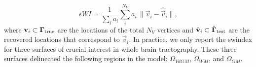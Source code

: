   \begin{equation}
  sWI = \frac{1}{\sum_i a_i} \sum\limits_i^{N_V} a_i\,\|
  \vec{v}_i - \hat{\vec{v}}_i \|,
  \label{eq:swindex}
  \end{equation}
  where $\mathbf{v}_i \subset \boldsymbol{\Gamma}_\text{true}$ are the locations of the total $N_V$ vertices
  and $\hat{\mathbf{v}}_i \subset \hat{\boldsymbol{\Gamma}}_\text{test}$ are the recovered locations
  that correspond to $\vec{v}_i$.
In practice, we only report the \gls*{swindex} for three surfaces of crucial interest in whole-brain
  tractography.
These three surfaces delineated the following regions in the model: $\Omega_{VdGM}$, $\Omega_{WM}$, and $\Omega_{GM}$.
